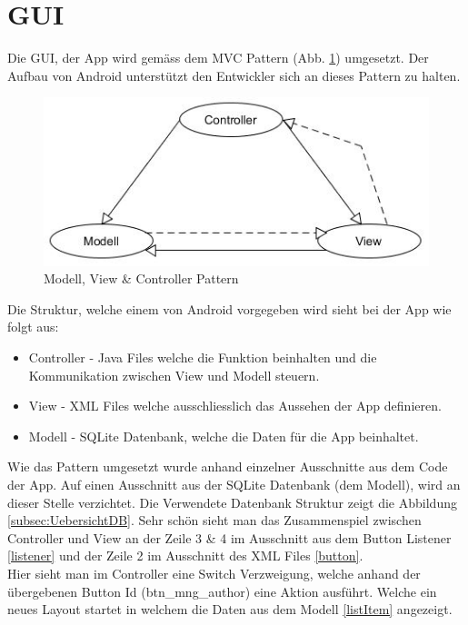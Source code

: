\section{GUI}
\label{sec:GUIumsetzung}

Die GUI, der App wird gemäss dem MVC Pattern (Abb. \ref{fig:MVC}) umgesetzt. Der Aufbau von Android unterstützt den Entwickler sich an dieses Pattern zu halten.

\begin{figure}[htbp]
	\centering
	\includegraphics[scale=0.8]{pic/MVC}
	\caption{Modell, View \& Controller Pattern}
	\label{fig:MVC}
\end{figure}

Die Struktur, welche einem von Android vorgegeben wird sieht bei der App wie folgt aus:

\begin{itemize}
	\item Controller - Java Files welche die Funktion beinhalten und die Kommunikation zwischen View und Modell steuern.
	\item View - XML Files welche ausschliesslich das Aussehen der App definieren.
	\item Modell - SQLite Datenbank, welche die Daten für die App beinhaltet.
\end{itemize}

Wie das Pattern umgesetzt wurde anhand einzelner Ausschnitte aus dem Code der App. Auf einen Ausschnitt aus der SQLite Datenbank (dem Modell), wird an dieser Stelle verzichtet. Die Verwendete Datenbank Struktur zeigt die Abbildung \ref{subsec:UebersichtDB}. Sehr schön sieht man das Zusammenspiel zwischen Controller und View an der Zeile 3 \& 4 im Ausschnitt aus dem Button Listener \ref{listener} und der Zeile 2 im Ausschnitt des XML Files \ref{button}.\\

Hier sieht man im Controller eine Switch Verzweigung, welche anhand der übergebenen Button Id (btn\_mng\_author) eine Aktion ausführt. Welche ein neues Layout startet in welchem die Daten aus dem Modell \ref{listItem} angezeigt. 


